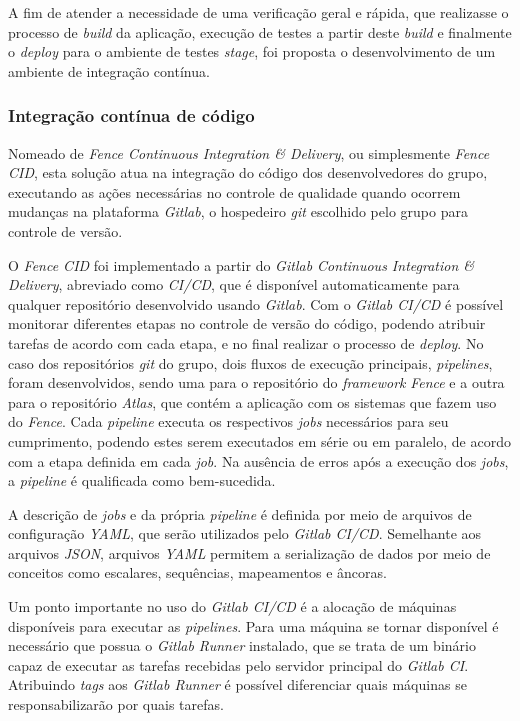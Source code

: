 A fim de atender a necessidade de uma verificação geral e rápida, que realizasse o processo de \emph{build} da aplicação, execução de testes a partir deste \emph{build} e finalmente o \emph{deploy} para o ambiente de testes \emph{stage}, foi proposta o desenvolvimento de um ambiente de integração contínua.

\hypertarget{integracao-continua-de-código}{%
\subsubsection{Integração contínua de código}\label{integracao-continua-de-código}}

Nomeado de \emph{Fence Continuous Integration \& Delivery}, ou simplesmente \emph{Fence CID}, esta solução atua na integração do código dos desenvolvedores do grupo, executando as ações necessárias no controle de qualidade quando ocorrem mudanças na plataforma \emph{Gitlab}, o hospedeiro \emph{git} escolhido pelo grupo para controle de versão.

O \emph{Fence CID} foi implementado a partir do \emph{Gitlab Continuous Integration \& Delivery}, abreviado como \emph{CI/CD}, que é disponível automaticamente para qualquer repositório desenvolvido usando \emph{Gitlab}. Com o \emph{Gitlab CI/CD} é possível monitorar diferentes etapas no controle de versão do código, podendo atribuir tarefas de acordo com cada etapa, e no final realizar o processo de \emph{deploy}. No caso dos repositórios \emph{git} do grupo, dois fluxos de execução principais, \emph{pipelines}, foram desenvolvidos, sendo uma para o repositório do \emph{framework} \emph{Fence} e a outra para o repositório \emph{Atlas}, que contém a aplicação com os sistemas que fazem uso do \emph{Fence}. Cada \emph{pipeline} executa os respectivos \emph{jobs} necessários para seu cumprimento, podendo estes serem executados em série ou em paralelo, de acordo com a etapa definida em cada \emph{job}. Na ausência de erros após a execução dos \emph{jobs}, a \emph{pipeline} é qualificada como bem-sucedida.

A descrição de \emph{jobs} e da própria \emph{pipeline} é definida por meio de arquivos de configuração \emph{YAML}, que serão utilizados pelo \emph{Gitlab CI/CD}. Semelhante aos arquivos \emph{JSON}, arquivos \emph{YAML} permitem a serialização de dados por meio de conceitos como escalares, sequências, mapeamentos e âncoras.

Um ponto importante no uso do \emph{Gitlab CI/CD} é a alocação de máquinas disponíveis para executar as \emph{pipelines}. Para uma máquina se tornar disponível é necessário que possua o \emph{Gitlab Runner} instalado, que se trata de um binário capaz de executar as tarefas recebidas pelo servidor principal do \emph{Gitlab CI}. Atribuindo \emph{tags} aos \emph{Gitlab Runner} é possível diferenciar quais máquinas se responsabilizarão por quais tarefas.

